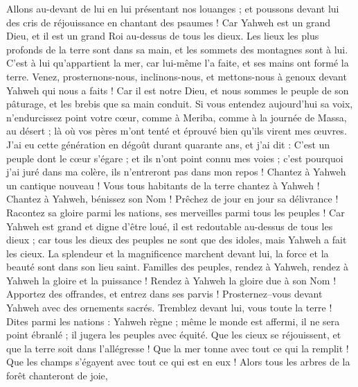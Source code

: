 \begin{multicols}{2}
Allons au-devant de lui en lui présentant nos louanges ; et poussons devant lui des cris de réjouissance en chantant des psaumes !
Car Yahweh est un grand Dieu, et il est un grand Roi au-dessus de tous les dieux.
Les lieux les plus profonds de la terre sont dans sa main, et les sommets des montagnes sont à lui.
C'est à lui qu'appartient la mer, car lui-même l'a faite, et ses mains ont formé la terre.
Venez, prosternons-nous, inclinons-nous, et mettons-nous à genoux devant Yahweh qui nous a faits !
Car il est notre Dieu, et nous sommes le peuple de son pâturage, et les brebis que sa main conduit. Si vous entendez aujourd'hui sa voix,
n'endurcissez point votre cœur, comme à Meriba, comme à la journée de Massa, au désert ;
là où vos pères m'ont tenté et éprouvé bien qu'ils virent mes œuvres.
J'ai eu cette génération en dégoût durant quarante ans, et j'ai dit : C'est un peuple dont le cœur s'égare ; et ils n'ont point connu mes voies ;
c'est pourquoi j'ai juré dans ma colère, ils n'entreront pas dans mon repos !
\VerseOne{}Chantez à Yahweh un cantique nouveau ! Vous tous habitants de la terre chantez à Yahweh !
Chantez à Yahweh, bénissez son Nom ! Prêchez de jour en jour sa délivrance !
Racontez sa gloire parmi les nations, ses merveilles parmi tous les peuples !
Car Yahweh est grand et digne d'être loué, il est redoutable au-dessus de tous les dieux ;
car tous les dieux des peuples ne sont que des idoles, mais Yahweh a fait les cieux.
La splendeur et la magnificence marchent devant lui, la force et la beauté sont dans son lieu saint.
Familles des peuples, rendez à Yahweh, rendez à Yahweh la gloire et la puissance !
Rendez à Yahweh la gloire due à son Nom ! Apportez des offrandes, et entrez dans ses parvis !
Prosternez–vous devant Yahweh avec des ornements sacrés. Tremblez devant lui, vous toute la terre !
Dites parmi les nations : Yahweh règne ; même le monde est affermi, il ne sera point ébranlé ; il jugera les peuples avec équité.
Que les cieux se réjouissent, et que la terre soit dans l'allégresse ! Que la mer tonne avec tout ce qui la remplit !
Que les champs s'égayent avec tout ce qui est en eux ! Alors tous les arbres de la forêt chanteront de joie,

\end{multicols}
